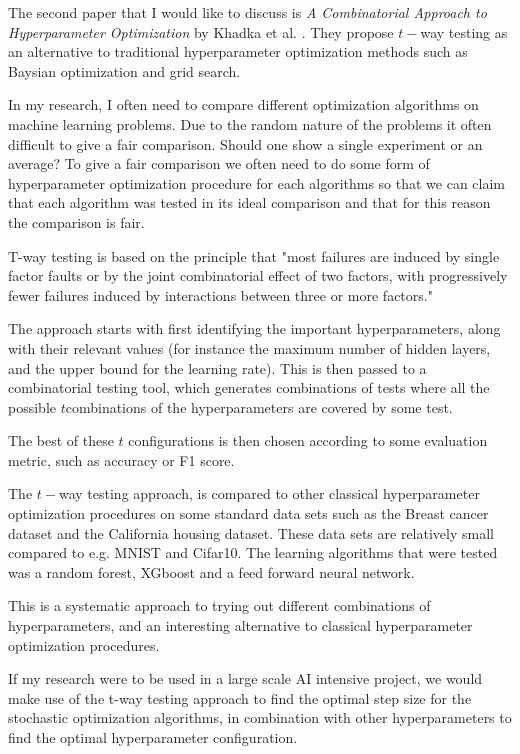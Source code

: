 \documentclass{article}
\begin{document}
The second paper that I would like to discuss is \emph{A Combinatorial Approach to Hyperparameter Optimization} by Khadka et al. \cite{khadka_2024}.
They propose $t-$way testing as an alternative to traditional hyperparameter optimization methods such as Baysian optimization and grid search. 

In my research, I often need to compare different optimization algorithms on machine learning problems. Due to the random nature of the problems it often difficult to give a fair comparison. Should one show a single experiment or an average? To give a fair comparison we often need to do some form of hyperparameter optimization procedure for each algorithms so that we can claim that each algorithm was tested in its ideal comparison and that for this reason the comparison is fair.

T-way testing is based on the principle that "most failures are induced by single factor faults or by the joint combinatorial effect of two factors, with progressively fewer failures induced by interactions between three or more factors." \cite{Kuhn}

The approach starts with first identifying the important hyperparameters, along with their relevant values (for instance the maximum number of hidden layers, and the upper bound for the learning rate).
This is then passed to a combinatorial testing tool, which generates combinations of tests where all the possible $t$combinations of the hyperparameters are covered by some test.

The best of these $t$ configurations is then chosen according to some evaluation metric, such as accuracy or F1 score.

The $t-$way testing approach, is compared to other classical hyperparameter optimization procedures on some standard data sets such as the Breast cancer dataset and the California housing dataset.
These data sets are relatively small compared to e.g. MNIST and Cifar10. The learning algorithms that were tested was a random forest, XGboost and a feed forward neural network.

This is a systematic approach to trying out different combinations of hyperparameters, and an interesting alternative to classical hyperparameter optimization procedures. 

If my research were to be used in a large scale AI intensive project, we would make use of the t-way testing approach to find the optimal step size for the stochastic optimization algorithms, in combination with other hyperparameters to find the optimal hyperparameter configuration.
\end{document}
